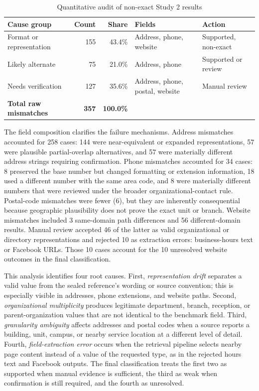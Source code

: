 \documentclass[12pt,oneside]{report}
\begin{document}
\begin{table}[H]
\caption{Quantitative audit of non-exact Study 2 results}
\label{tab:study2_root_causes}
\centering
\small
\begin{tabularx}{\textwidth}{@{}>{\raggedright\arraybackslash}Xrr>{\raggedright\arraybackslash}X>{\raggedright\arraybackslash}X@{}}
\toprule
\textbf{Cause group} & \textbf{Count} & \textbf{Share} & \textbf{Fields} & \textbf{Action} \\
\midrule
Format or representation & 155 & 43.4\% & Address, phone, website & Supported, non-exact \\
Likely alternate & 75 & 21.0\% & Address, phone & Supported or review \\
Needs verification & 127 & 35.6\% & Address, phone, postal, website & Manual review \\
\textbf{Total raw mismatches} & \textbf{357} & \textbf{100.0\%} & & \\
\bottomrule
\end{tabularx}
\end{table}

The field composition clarifies the failure mechanisms. Address mismatches accounted for 258 cases: 144 were near-equivalent or expanded representations, 57 were plausible partial-overlap alternatives, and 57 were materially different address strings requiring confirmation. Phone mismatches accounted for 34 cases: 8 preserved the base number but changed formatting or extension information, 18 used a different number with the same area code, and 8 were materially different numbers that were reviewed under the broader organizational-contact rule. Postal-code mismatches were fewer (6), but they are inherently consequential because geographic plausibility does not prove the exact unit or branch. Website mismatches included 3 same-domain path differences and 56 different-domain results. Manual review accepted 46 of the latter as valid organizational or directory representations and rejected 10 as extraction errors: business-hours text or Facebook URLs. Those 10 cases account for the 10 unresolved website outcomes in the final classification.

This analysis identifies four root causes. First, \textit{representation drift} separates a valid value from the sealed reference's wording or source convention; this is especially visible in addresses, phone extensions, and website paths. Second, \textit{organizational multiplicity} produces legitimate department, branch, reception, or parent-organization values that are not identical to the benchmark field. Third, \textit{granularity ambiguity} affects addresses and postal codes when a source reports a building, unit, campus, or nearby service location at a different level of detail. Fourth, \textit{field-extraction error} occurs when the retrieval pipeline selects nearby page content instead of a value of the requested type, as in the rejected hours text and Facebook outputs. The final classification treats the first two as supported when manual evidence is sufficient, the third as weak when confirmation is still required, and the fourth as unresolved.
\end{document}
